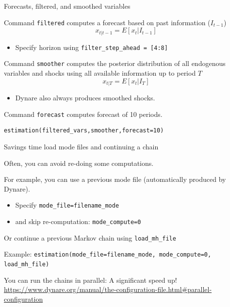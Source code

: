 \begin{frame}[fragile]{Forecasts, filtered, and smoothed variables }
\begin{wideitemize}
\item Command \texttt{filtered} computes a forecast based on past information ($I_{t-1}$)
\begin{equation*}
    x_{t|t-1} = E\left[x_t|I_{t-1}\right]
\end{equation*}
\begin{itemize}
    \item Specify horizon using \texttt{filter\_step\_ahead = [4:8]}
\end{itemize}
\item Command \texttt{smoother} computes the posterior distribution of all endogenous variables and shocks using all available information up to period $T$
\begin{equation*}
    x_{t|T} = E\left[x_t|I_{T}\right]
\end{equation*}
\begin{itemize}
    \item Dynare also always produces smoothed shocks.  
\end{itemize}
\item Command \texttt{forecast} computes forecast of 10 periods.
\begin{verbatim}
estimation(filtered_vars,smoother,forecast=10)
\end{verbatim}
\end{wideitemize}
\end{frame}



\begin{frame}{Savings time load mode files and continuing a chain}
\begin{wideitemize}
\item Often, you can avoid re-doing some computations.
\item For example, you can use a previous mode file (automatically produced by Dynare).
\begin{itemize}
    \item Specify \texttt{mode\_file=filename\_mode}
    \item and skip re-computation: \texttt{mode\_compute=0}
\end{itemize}
\item Or continue a previous Markov chain using \texttt{load\_mh\_file}
\item Example: \texttt{estimation(mode\_file=filename\_mode, mode\_compute=0,
load\_mh\_file)}
\item You can run the chains in parallel: A significant speed up! \url{https://www.dynare.org/manual/the-configuration-file.html\#parallel-configuration}
\end{wideitemize}
\end{frame}

